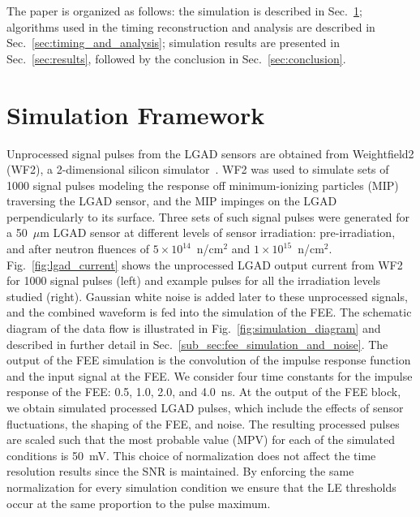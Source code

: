 \documentclass[preprint,1p]{elsarticle}
\begin{document}
The paper is organized as follows: the simulation is described in
Sec.~\ref{sec:simulation}; algorithms used in the timing
reconstruction and analysis are described in Sec.~\ref{sec:timing_and_analysis}; simulation results
are presented in Sec.~\ref{sec:results}, followed by the conclusion in
Sec.~\ref{sec:conclusion}.

\section{Simulation Framework}
\label{sec:simulation}

Unprocessed signal pulses from the LGAD sensors are obtained from Weightfield2
(WF2), a 2-dimensional silicon simulator~\cite{Sadrozinski:2017qpv}. WF2 was
used to simulate sets of 1000 signal pulses modeling the response off
minimum-ionizing particles (MIP) traversing the LGAD sensor, and the MIP
impinges on the LGAD perpendicularly to its surface. Three sets of such signal
pulses were generated for a 50~$\mu$m LGAD sensor at different levels of sensor
irradiation: pre-irradiation, and after neutron fluences of $5\times
10^{14}$~n/cm$^2$ and $1\times 10^{15}$~n/cm$^2$. Fig.~\ref{fig:lgad_current} shows the
unprocessed LGAD output current from WF2 for 1000 signal pulses (left)
and example pulses for all the irradiation levels studied (right).
Gaussian white noise is added later
to these unprocessed signals, and the combined waveform is fed into the
simulation of the FEE. The schematic diagram of the data flow is illustrated
in Fig.~\ref{fig:simulation_diagram} and described in further detail in
Sec.~\ref{sub_sec:fee_simulation_and_noise}. The output of the FEE simulation is
the convolution of the impulse response function and the input signal at the
FEE. We consider four time constants for the impulse response of the FEE:
0.5, 1.0, 2.0, and 4.0~\si{ns}. At the output of the FEE block, we obtain
simulated processed LGAD pulses, which include the effects of sensor
fluctuations, the shaping of the FEE, and noise. The resulting processed pulses
are scaled such that the most probable value (MPV) for each of the simulated conditions is 50~\si{mV}.
This choice of normalization does not affect the time resolution results since the SNR is
maintained. By enforcing the same normalization for every simulation condition
 we ensure that the LE thresholds occur at the same proportion to the pulse maximum. 
\end{document}
